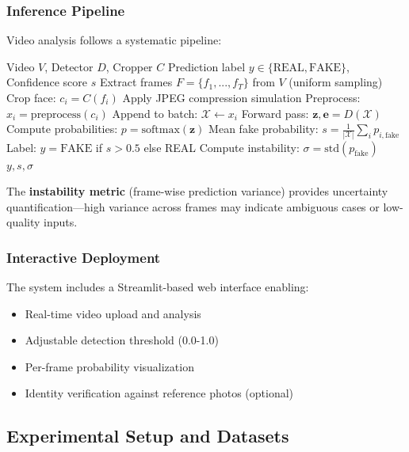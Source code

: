 \documentclass[11pt,a4paper]{article}
\begin{document}
\subsubsection{Inference Pipeline}

Video analysis follows a systematic pipeline:

\begin{algorithm}[H]
\caption{Deepfake Video Detection}
\begin{algorithmic}[1]
\Require Video $V$, Detector $D$, Cropper $C$
\Ensure Prediction label $y \in \{\text{REAL}, \text{FAKE}\}$, Confidence score $s$
\State Extract frames $F = \{f_1, ..., f_T\}$ from $V$ (uniform sampling)
    \State Crop face: $c_i = C(f_i)$
        \State Apply JPEG compression simulation
        \State Preprocess: $x_i = \text{preprocess}(c_i)$
        \State Append to batch: $\mathcal{X} \leftarrow x_i$
    \EndIf
\EndFor
\State Forward pass: $\mathbf{z}, \mathbf{e} = D(\mathcal{X})$
\State Compute probabilities: $p = \text{softmax}(\mathbf{z})$
\State Mean fake probability: $s = \frac{1}{|\mathcal{X}|} \sum_{i} p_{i,\text{fake}}$
\State Label: $y = \text{FAKE}$ if $s > 0.5$ else REAL
\State Compute instability: $\sigma = \text{std}(p_{\text{fake}})$
\State \Return $y, s, \sigma$
\end{algorithmic}
\end{algorithm}

The \textbf{instability metric} (frame-wise prediction variance) provides uncertainty quantification---high variance across frames may indicate ambiguous cases or low-quality inputs.

\subsubsection{Interactive Deployment}

The system includes a Streamlit-based web interface enabling:
\begin{itemize}
    \item Real-time video upload and analysis
    \item Adjustable detection threshold (0.0-1.0)
    \item Per-frame probability visualization
    \item Identity verification against reference photos (optional)
\end{itemize}

\subsection{Experimental Setup and Datasets}
\end{document}
